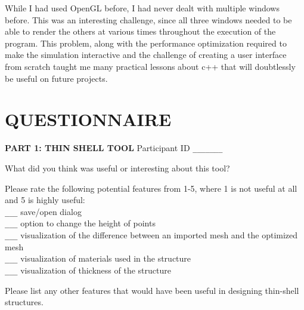 \documentclass{thesis}
\begin{document}
While I had used OpenGL before, I had never dealt with multiple windows before.  This was an interesting challenge, since all
three windows needed to be able to render the others at various times throughout the execution of the program.  This problem,
along with the performance optimization required to make the simulation interactive and the challenge of creating a user
interface from scratch taught me many practical lessons about c++ that will doubtlessly be useful on future projects.


\begin{singlespace}


\end{singlespace}

\appendix    %
\chapter{QUESTIONNAIRE}
\setlength{\parindent}{0in} 
{\bf PART 1: THIN SHELL TOOL} 
\hfill Participant ID \verb+_______+
\vspace{0.3in}

What did you think was useful or interesting about this tool?
\vspace{1.1in}

Please rate the following potential features from 1-5, where 1 is not useful at all and 5 is highly useful: \\

\verb+___+ save/open dialog\\
\verb+___+ option to change the height of points\\
\verb+___+ visualization of the difference between an imported mesh and the optimized mesh\\
\verb+___+ visualization of materials used in the structure\\
\verb+___+ visualization of thickness of the structure


\vspace{0.3in}

Please list any other features that would have been useful in designing thin-shell structures.
\vspace{1.2in}
\end{document}
